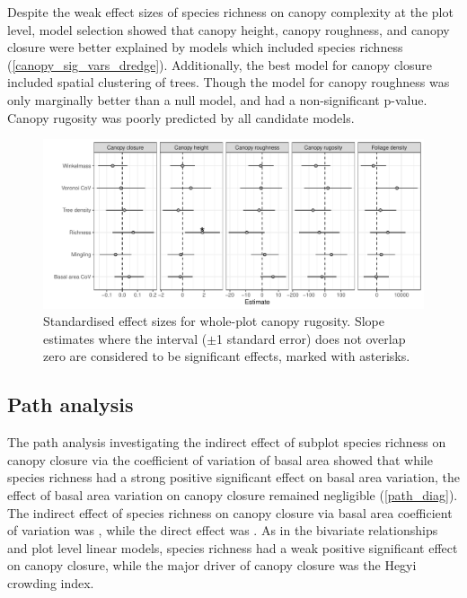 \documentclass[11pt,a4paper]{article}
\begin{document}
Despite the weak effect sizes of species richness on canopy complexity at the plot level, model selection showed that canopy height, canopy roughness, and canopy closure were better explained by models which included species richness (\autoref{canopy_sig_vars_dredge}). Additionally, the best model for canopy closure included spatial clustering of trees. Though the model for canopy roughness was only marginally better than a null model, and had a non-significant p-value. Canopy rugosity was poorly predicted by all candidate models.

\begin{figure}
	\includegraphics[width=\linewidth]{canopy_rough_slopes}
	\caption{Standardised effect sizes for whole-plot canopy rugosity. Slope estimates where the interval ($\pm$1 standard error) does not overlap zero are considered to be significant effects, marked with asterisks.}
	\label{canopy_rough_slopes}
\end{figure}




\subsection{Path analysis}

The path analysis investigating the indirect effect of subplot species richness on canopy closure via the coefficient of variation of basal area showed that while species richness had a strong positive significant effect on basal area variation, the effect of basal area variation on canopy closure remained negligible (\autoref{path_diag}). The indirect effect of species richness on canopy closure via basal area coefficient of variation was \ccind{}, while the direct effect was \ccdir{}. As in the bivariate relationships and plot level linear models, species richness had a weak positive significant effect on canopy closure, while the major driver of canopy closure was the Hegyi crowding index.
\end{document}
